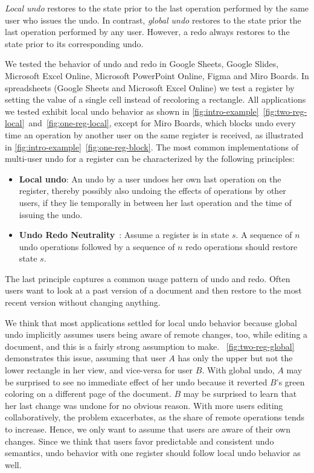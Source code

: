 \documentclass[sigplan]{acmart}
\begin{document}
\emph{Local undo} restores to the state prior to the last operation
performed by the same user who issues the undo.
In contrast, \emph{global undo} restores to the state prior the
last operation performed by any user.
However, a redo always restores to the state prior to its corresponding undo.


We tested the behavior of undo and redo in Google Sheets, Google Slides,
Microsoft Excel Online, Microsoft PowerPoint Online, Figma and Miro Boards.
In spreadsheets (Google Sheets and Microsoft Excel Online)
we test a register by setting the value of a single cell instead of recoloring
a rectangle.
All applications we tested exhibit local undo behavior as shown in
\cref{fig:intro-example}~\ref{fig:two-reg-local}~and~\ref{fig:one-reg-local},
except for Miro Boards, which blocks undo every time an operation
by another user on the same register is received, as illustrated
in \cref{fig:intro-example}~\ref{fig:one-reg-block}.
The most common implementations of multi-user undo for a register
can be characterized by the following principles:

\begin{itemize}
  \item \textbf{Local undo}:
    An undo by a user undoes her own last operation on the register,
    thereby possibly also undoing the effects of operations
    by other users,
    if they lie temporally in between her last operation and the time of
    issuing the undo.
  \item \textbf{Undo Redo Neutrality}~\cite{figma2019multiplayer}:
    Assume a register is in state $s$.
    A sequence of $n$ undo operations followed by a sequence of $n$ redo operations
    should restore state $s$.
\end{itemize}

The last principle captures a common usage pattern of undo and redo.
Often users want to look at a past version of a document and then restore
to the most recent version without changing anything.


We think that most applications settled for local undo behavior because
global undo implicitly assumes users being aware of remote changes, too,
while editing a document, and this is a fairly strong assumption to make.
~\ref{fig:two-reg-global} demonstrates this issue,
assuming that user $A$ has only the upper but not the lower rectangle in her view,
and vice-versa for user $B$.
With global undo, $A$ may be surprised to see no immediate effect of her undo
because it reverted $B$'s green coloring on a different page of the document.
$B$ may be surprised to learn that her last change was undone for no obvious reason.
With more users editing collaboratively, the problem exacerbates, as the
share of remote operations tends to increase.
Hence, we only want to assume that users are aware of their own changes.
Since we think that users favor predictable and consistent undo semantics,
undo behavior with one register should follow local undo behavior as well.
\end{document}
